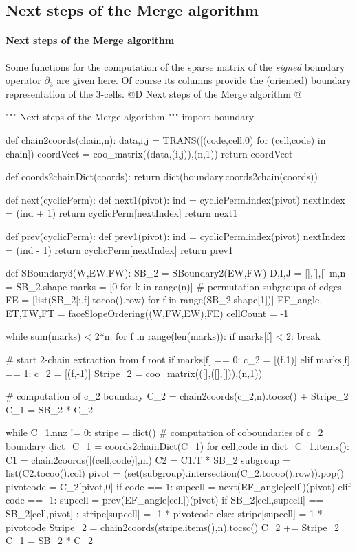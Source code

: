 \documentclass[11pt,oneside]{article}    %
\begin{document}
\subsection{Next steps of the Merge algorithm}

\paragraph{Next steps of the Merge algorithm}
Some functions for the computation of the sparse matrix of the \emph{signed} boundary operator $\partial_3$ are given here. Of course its columns provide the (oriented) boundary representation of the 3-cells.
@D Next steps of the Merge algorithm
@{""" Next steps of the Merge algorithm """  
import boundary
  
def chain2coords(chain,n):
	data,i,j = TRANS([(code,cell,0) for (cell,code) in chain])
	coordVect = coo_matrix((data,(i,j)),(n,1))
	return coordVect
	
def coords2chainDict(coords):
	return dict(boundary.coords2chain(coords))

def next(cyclicPerm):
	def next1(pivot):
		ind = cyclicPerm.index(pivot)
		nextIndex = (ind + 1) %
		return cyclicPerm[nextIndex]
	return next1

def prev(cyclicPerm):
	def prev1(pivot):
		ind = cyclicPerm.index(pivot)
		nextIndex = (ind - 1) %
		return cyclicPerm[nextIndex]
	return prev1

def SBoundary3(W,EW,FW):
	SB_2 = SBoundary2(EW,FW)
	D,I,J = [],[],[]
	m,n = SB_2.shape
	marks = [0 for k in range(n)]
	# permutation subgroups of edges
	FE = [list(SB_2[:,f].tocoo().row) for f in range(SB_2.shape[1])]
	EF_angle, ET,TW,FT = faceSlopeOrdering((W,FW,EW),FE)
	cellCount = -1

	while sum(marks) < 2*n:
		for f in range(len(marks)):
			if marks[f] < 2:  break	
		
		# start 2-chain extraction from f root
		if marks[f] == 0: c_2 = [(f,1)] 
		elif marks[f] == 1: c_2 = [(f,-1)] 
		Stripe_2 = coo_matrix(([],([],[])),(n,1))
	
		# computation of c_2 boundary
		C_2 = chain2coords(c_2,n).tocsc() + Stripe_2
		C_1 = SB_2 * C_2

		while C_1.nnz != 0:	
			stripe = dict()
			# computation of coboundaries of c_2 boundary
			dict_C_1 = coords2chainDict(C_1)
			for cell,code in dict_C_1.items():
				C1 = chain2coords([(cell,code)],m)
				C2 = C1.T * SB_2
				subgroup = list(C2.tocoo().col)
				pivot = (set(subgroup).intersection(C_2.tocoo().row)).pop()
				pivotcode = C_2[pivot,0]
				if code == 1: 
					supcell = next(EF_angle[cell])(pivot)
				elif code == -1:
					supcell = prev(EF_angle[cell])(pivot)
				if SB_2[cell,supcell] == SB_2[cell,pivot] :
					stripe[supcell] = -1 * pivotcode
				else:
					stripe[supcell] = 1 * pivotcode
			Stripe_2 = chain2coords(stripe.items(),n).tocsc()
			C_2 += Stripe_2
			C_1 = SB_2 * C_2
		
}
\end{document}

